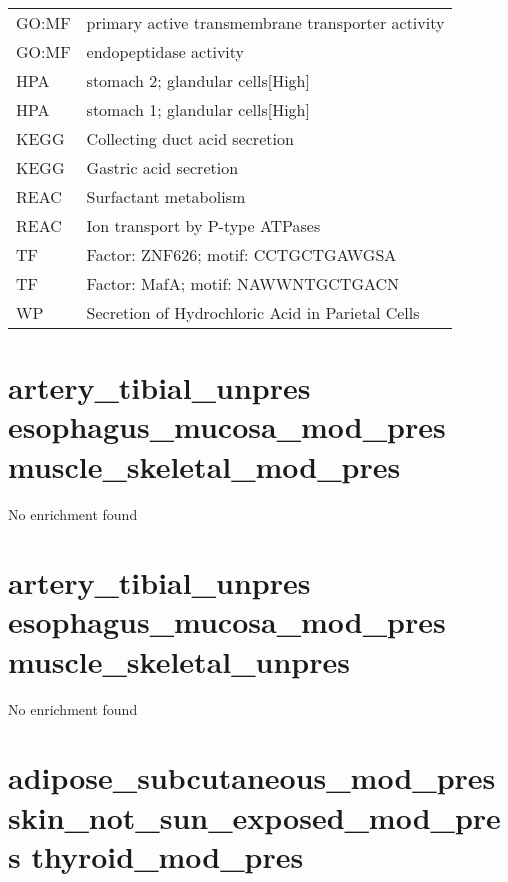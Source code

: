 \begin{longtable}{ll}
GO:MF & primary active transmembrane transporter activity\\
GO:MF & endopeptidase activity\\
HPA & stomach 2; glandular cells[High]\\
HPA & stomach 1; glandular cells[High]\\
KEGG & Collecting duct acid secretion\\
KEGG & Gastric acid secretion\\
REAC & Surfactant metabolism\\
REAC & Ion transport by P-type ATPases\\
TF & Factor: ZNF626; motif: CCTGCTGAWGSA\\
TF & Factor: MafA; motif: NAWWNTGCTGACN\\
WP & Secretion of Hydrochloric Acid in Parietal Cells\\
\bottomrule
\end{longtable}

\section*{artery\_tibial\_unpres \newline esophagus\_mucosa\_mod\_pres \newline muscle\_skeletal\_mod\_pres}
No enrichment found

\section*{artery\_tibial\_unpres \newline esophagus\_mucosa\_mod\_pres \newline muscle\_skeletal\_unpres}
No enrichment found

\section*{adipose\_subcutaneous\_mod\_pres \newline skin\_not\_sun\_exposed\_mod\_pres \newline thyroid\_mod\_pres}

